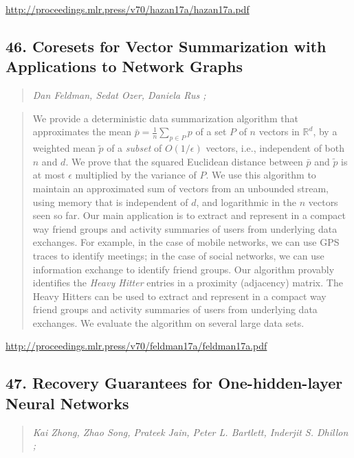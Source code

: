 \documentclass{article}
\begin{document}
\href{http://proceedings.mlr.press/v70/hazan17a/hazan17a.pdf}{http://proceedings.mlr.press/v70/hazan17a/hazan17a.pdf}

\subsection{46. Coresets for Vector Summarization with Applications to Network Graphs}

\begin{quote}
\footnotesize{\textit{Dan Feldman, Sedat Ozer, Daniela Rus ;}}
\end{quote}

\begin{quote}
    We provide a deterministic data summarization algorithm that approximates the mean $\bar{p}=\frac{1}{n}\sum_{p\in P} p$ of a set $P$ of $n$ vectors in $\mathbb{R}^d$, by a weighted mean $\tilde{p}$ of a \textit{subset} of $O(1/\epsilon)$ vectors, i.e., independent of both $n$ and $d$. We prove that the squared Euclidean distance between $\bar{p}$ and $\tilde{p}$ is at most $\epsilon$ multiplied by the variance of $P$. We use this algorithm to maintain an approximated sum of vectors from an unbounded stream, using memory that is independent of $d$, and logarithmic in the $n$ vectors seen so far. Our main application is to extract and represent in a compact way friend groups and activity summaries of users from underlying data exchanges. For example, in the case of mobile networks, we can use GPS traces to identify meetings; in the case of social networks, we can use information exchange to identify friend groups. Our algorithm provably identifies the \textit{Heavy Hitter} entries in a proximity (adjacency) matrix. The Heavy Hitters can be used to extract and represent in a compact way friend groups and activity summaries of users from underlying data exchanges. We evaluate the algorithm on several large data sets.  \end{quote}

\href{http://proceedings.mlr.press/v70/feldman17a/feldman17a.pdf}{http://proceedings.mlr.press/v70/feldman17a/feldman17a.pdf}

\subsection{47. Recovery Guarantees for One-hidden-layer Neural Networks}

\begin{quote}
\footnotesize{\textit{Kai Zhong, Zhao Song, Prateek Jain, Peter L. Bartlett, Inderjit S. Dhillon ;}}
\end{quote}
\end{document}
